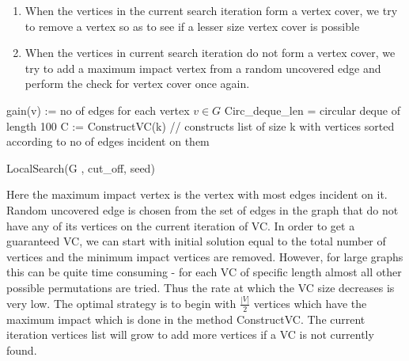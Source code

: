 \begin{enumerate}
\item When the vertices in the current search iteration form a vertex cover, we try to remove a vertex so as to see if a lesser size vertex cover is possible

\item When the vertices in current search iteration do not form a vertex cover, we try to add a maximum impact vertex from a random uncovered edge and perform the check for vertex cover once again.
\end{enumerate}
\begin{algorithm}[ht]
\SetAlgoNoLine
{}
{gain(v) := no of edges for each vertex $v \in G$\;
Circ\_deque\_len = circular deque of length 100\;
C := ConstructVC(k) // constructs list of size k with vertices sorted according to no of edges incident on them\;
}
\caption{LocalSearch(G , cut\_off, seed)}
\end{algorithm}

Here the maximum impact vertex is the vertex with most edges incident on it. Random uncovered edge is chosen from the set of edges in the graph that do not have any of its vertices on the current iteration of VC. In order to get a guaranteed VC, we can start with initial solution equal to the total number of vertices and the minimum impact vertices are removed. However, for large graphs this can be quite time consuming - for each VC of specific length almost all other possible permutations are tried. Thus the rate at which the VC size decreases is very low. The optimal strategy is to begin with $\frac{\left| V \right|}{2}$ vertices which have the maximum impact which is done in the method ConstructVC. The current iteration vertices list will grow to add more vertices if a VC is not currently found.
